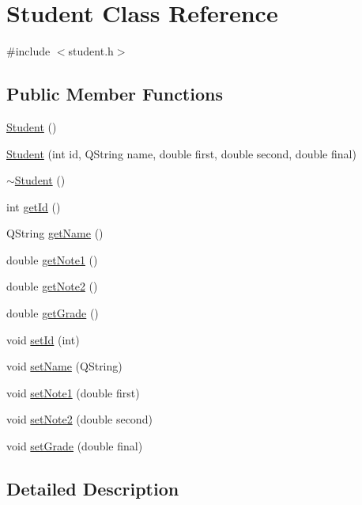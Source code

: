 \hypertarget{class_student}{}\section{Student Class Reference}
\label{class_student}


{\ttfamily \#include $<$student.\+h$>$}

\subsection*{Public Member Functions}
\begin{DoxyCompactItemize}
\item 
\hyperlink{class_student_af9168cedbfa5565cf0b20c1a9d3f5c9d}{Student} ()
\item 
\hyperlink{class_student_a8be0f0367189bafdc4fcbf769f2ba1ea}{Student} (int id, Q\+String name, double first, double second, double final)
\item 
\hyperlink{class_student_a54a8ea060d6cd04222c3a2f89829f105}{$\sim$\+Student} ()
\item 
int \hyperlink{class_student_a78a58b686f5fe10a925cf5c9881d4b4e}{get\+Id} ()
\item 
Q\+String \hyperlink{class_student_acb80036076a28fe8da7286e9221b7a70}{get\+Name} ()
\item 
double \hyperlink{class_student_a29729c85cc79a39758195555a6eb2b82}{get\+Note1} ()
\item 
double \hyperlink{class_student_a2a6b2ee8fb59cba373857db40d67bde8}{get\+Note2} ()
\item 
double \hyperlink{class_student_adc8f97cd02635cd61cf956ec84b3b209}{get\+Grade} ()
\item 
void \hyperlink{class_student_a07553589db9285a6f865c10a0339dbee}{set\+Id} (int)
\item 
void \hyperlink{class_student_a488cb45d7f919f63ffb9655d7f149e39}{set\+Name} (Q\+String)
\item 
void \hyperlink{class_student_aba90995b452367991dbbdc657367f689}{set\+Note1} (double first)
\item 
void \hyperlink{class_student_a8f662079724f5e88e0278b7479da4b9f}{set\+Note2} (double second)
\item 
void \hyperlink{class_student_acad91aa3054f297e5f9bc8056c083d98}{set\+Grade} (double final)
\end{DoxyCompactItemize}


\subsection{Detailed Description}


